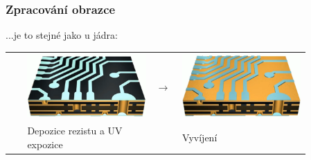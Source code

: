 \documentclass{beamer}
\begin{document}
\begin{frame}
	\frametitle{Zpracování obrazce}
	...je to stejné jako u jádra:
	\begin{center}
	
		\begin{tabular}{m{0.05\linewidth} m{0.38\linewidth} m{0.05\linewidth} m{0.38\linewidth}}
		 \Large & \includegraphics[scale=0.12]{vnejsiOsvit.png} & \Large\textbf{$\rightarrow$} & \includegraphics[scale=0.12]{vnejsiVyvolani.png}\\
		 & Depozice rezistu a UV expozice & & Vyvíjení \\

\end{tabular}
\end{center}
\end{frame}
\end{document}
